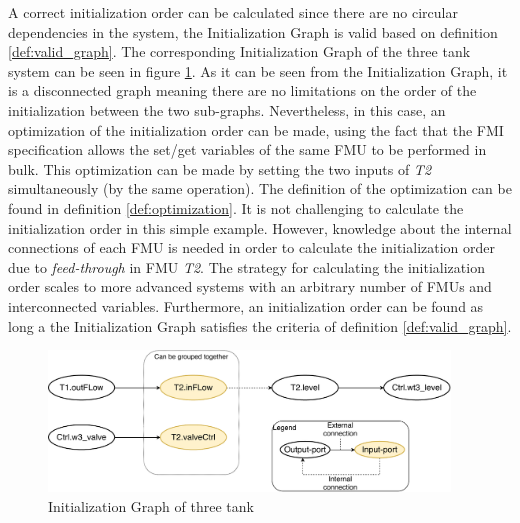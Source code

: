 \documentclass[runningheads]{llncs}
\begin{document}
\noindent A correct initialization order can be calculated since there are no circular dependencies in the system, the Initialization Graph is valid based on definition \ref{def:valid_graph}. The corresponding Initialization Graph of the three tank system can be seen in figure \ref{fig:initilizationGraph}. As it can be seen from the Initialization Graph, it is a disconnected graph meaning there are no limitations on the order of the initialization between the two sub-graphs. Nevertheless, in this case, an optimization of the initialization order can be made, using the fact that the FMI specification allows the set/get variables of the same FMU to be performed in bulk. This optimization can be made by setting the two inputs of \textit{T2} simultaneously (by the same operation). The definition of the optimization can be found in definition \ref{def:optimization}.
It is not challenging to calculate the initialization order in this simple example. However, knowledge about the internal connections of each FMU is needed in order to calculate the initialization order due to \textit{feed-through} in FMU \textit{T2}. The strategy for calculating the initialization order scales to more advanced systems with an arbitrary number of FMUs and interconnected variables. Furthermore, an initialization order can be found as long a the Initialization Graph satisfies the criteria of definition \ref{def:valid_graph}.

\begin{figure}
    \centering
      \includegraphics[width=0.95\textwidth]{images/threetank_initialization.pdf}
    \caption{Initialization Graph of three tank}
  \label{fig:initilizationGraph}
\end{figure}
\end{document}
